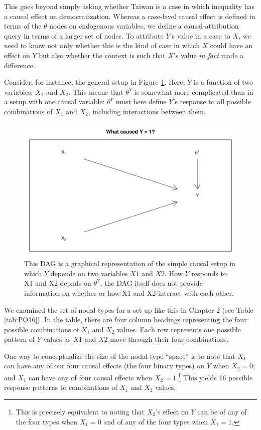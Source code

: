 \documentclass[
  12pt,
]{book}
\begin{document}
This goes beyond simply asking whether Taiwan is a case in which inequality has a causal effect on democratization. Whereas a case-level causal effect is defined in terms of the \(\theta\) nodes on endogenous variables, we define a causal-attribution query in terms of a larger set of nodes. To attribute \(Y\)'s value in a case to \(X\), we need to know not only whether this is the kind of case in which \(X\) could have an effect on \(Y\) but also whether the context is such that \(X\)'s value \emph{in fact} made a difference.

Consider, for instance, the general setup in Figure \ref{fig:attribquery}. Here, \(Y\) is a function of two variables, \(X_1\) and \(X_2\). This means that \(\theta^Y\) is somewhat more complicated than in a setup with one causal variable: \(\theta^Y\) must here define \(Y\)'s response to all possible combinations of \(X_1\) and \(X_2\), including interactions between them.

\begin{figure}

{\centering \includegraphics[width=0.6\linewidth]{ii_files/figure-latex/attribquery-1} 

}

\caption{This DAG is a graphical representation of the simple causal setup in which $Y$ depends on two variables $X1$ and $X2$. How $Y$ responds to X1 and X2 depnds on $\theta^Y$, the DAG itself does not provide information on whether or how X1 and X2 interact with each other.}\label{fig:attribquery}
\end{figure}

We examined the set of nodal types for a set up like this in Chapter 2 (see Table \ref{tab:PO16}). In the table, there are four column headings representing the four possible combinations of \(X_1\) and \(X_2\) values. Each row represents one possible pattern of \(Y\) values as \(X1\) and \(X2\) move through their four combinations.

One way to conceptualize the size of the nodal-type ``space'' is to note that \(X_1\) can have any of our four causal effects (the four binary types) on \(Y\) when \(X_2=0\); and \(X_1\) can have any of four causal effects when \(X_2=1\).\footnote{This is precisely equivalent to noting that \(X_2\)'s effect on \(Y\) can be of any of the four types when \(X_1=0\) and of any of the four types when \(X_1=1\).} This yields 16 possible response patterns to combinations of \(X_1\) and \(X_2\) values.
\end{document}
